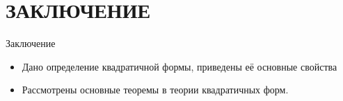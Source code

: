 \documentclass[10pt,pdf,hyperref={unicode}]{beamer}
\begin{document}
\section{ЗАКЛЮЧЕНИЕ}
\begin{frame}{Заключение}
\begin{block}

\begin{itemize}

\item{Дано определение квадратичной формы, приведены её основные свойства}
\item{Рассмотрены основные теоремы в теории квадратичных форм.}

\end{itemize}

\end{block}
\end{frame} 
\end{document}
